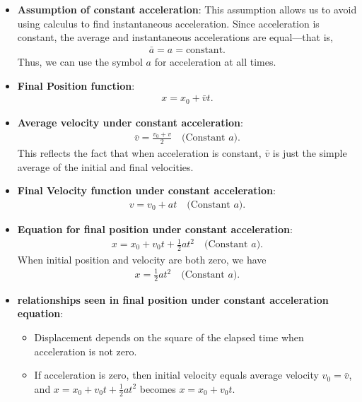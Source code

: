 \documentclass{report}
\begin{document}
\begin{itemize}
        \item \textbf{Assumption of constant acceleration}: This assumption allows us to avoid using calculus to find instantaneous acceleration. Since acceleration is constant, the average and instantaneous accelerations are equal—that is,
            \begin{align*}
                \bar{a} = a = \text{constant}
            .\end{align*}
            Thus, we can use the symbol $a$ for acceleration at all times.
        \item \textbf{Final Position function}: 
            \begin{align*}
                x = x_{0}  + \bar{v}t
            .\end{align*}
        \item \textbf{Average velocity under constant acceleration}:
            \begin{align*}
                \bar{v} = \frac{v_{0} + v}{2} \quad \text{(Constant $a$)}
            .\end{align*}
            This reflects the fact that when acceleration is constant, $\bar{v}$ is just the simple average of the initial and final velocities.
        \item \textbf{Final Velocity function under constant acceleration}:
            \begin{align*}
                v = v_{0} + at \quad \text{(Constant $a$)}
            .\end{align*}
        \item \textbf{Equation for final position under constant acceleration}:
            \begin{align*}
                x = x_{0} +v_{0}t + \frac{1}{2}at^{2} \quad \text{(Constant $a$)}
            .\end{align*}
            When initial position and velocity are both zero, we have
            \begin{align*}
                x =  \frac{1}{2}at^{2} \quad \text{(Constant $a$)}
            .\end{align*}
        \item \textbf{relationships seen in final position under constant acceleration equation}:
            \begin{itemize}
                \item Displacement depends on the square of the elapsed time when acceleration is not zero.
                \item If acceleration is zero, then initial velocity equals average velocity \(v_0 = \bar{v}\), and \(x = x_0 + v_0t + \frac{1}{2}at^2\) becomes \(x = x_0 + v_0t\).

\end{itemize}
\end{itemize}
\end{document}
